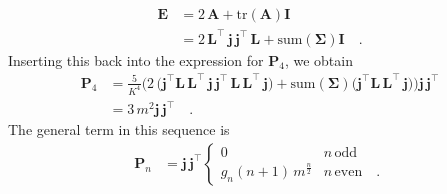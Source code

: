 %
\begin{align}
    \mathbf{E} & =
    2 \, \mathbf{A} + \mathrm{tr}(\mathbf{A}) \mathbf{I}
    \nonumber      \\
               & =
    2 \, \mathbf{L}^\top \, \mathbf{j} \, \mathbf{j}^\top \, \mathbf{L} + \mathrm{sum}(\pmb{\Sigma}) \mathbf{I}
    \quad.
\end{align}
%
Inserting this back into the expression for $\mathbf{P}_4$, we obtain
%
\begin{align}
    \mathbf{P}_4 & =
    \frac{5}{K^4}
    \bigg(
    2 \, \big(\mathbf{j}^\top \mathbf{L} \, \mathbf{L}^\top \, \mathbf{j} \, \mathbf{j}^\top \, \mathbf{L} \, \mathbf{L}^\top \, \mathbf{j} \big)
    +
    \mathrm{sum}(\pmb{\Sigma}) \big(\mathbf{j}^\top \mathbf{L} \, \mathbf{L}^\top \, \mathbf{j} \big)
    \bigg) \mathbf{j} \, \mathbf{j}^\top
    \nonumber        \\
                 & =
    3 \, m^2 \mathbf{j} \, \mathbf{j}^\top
    \quad.
\end{align}
%
The general term in this sequence is
%
\begin{align}
    \mathbf{P}_n & =
    \mathbf{j} \, \mathbf{j}^\top
    \begin{cases}
        0                            & n \, \mathrm{odd}
        \\
        g_n (n + 1) \, m^\frac{n}{2} & n \, \mathrm{even}
        \quad.
    \end{cases}
\end{align}
%


